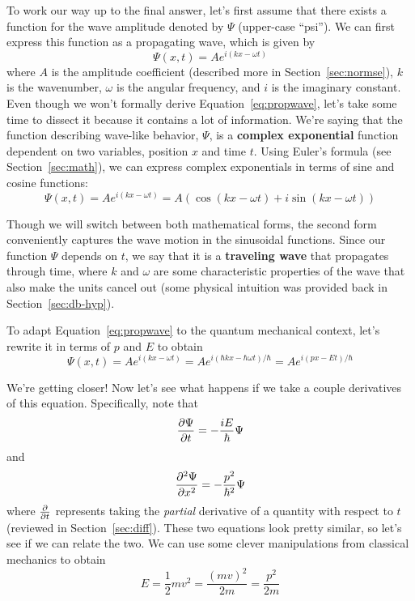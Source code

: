 To work our way up to the final answer, let's first assume that there exists a function for the wave amplitude denoted by $\Psi$ (upper-case ``psi''). We can first express this function as a propagating wave, which is given by
\begin{equation}
	\Psi(x,t) = Ae^{i(kx-\omega t)} \label{eq:propwave}
\end{equation}
where $A$ is the amplitude coefficient (described more in  Section~\ref{sec:normse}), $k$ is the wavenumber, $\omega$ is the angular frequency, and $i$ is the imaginary constant. Even though we won't formally derive Equation~\ref{eq:propwave}, let's take some time to dissect it because it contains a lot of information. We're saying that the function describing wave-like behavior, $\Psi$, is a \textbf{complex exponential} function dependent on two variables, position $x$ and time $t$. Using Euler's formula (see Section~\ref{sec:math}), we can express complex exponentials in terms of sine and cosine functions:
\begin{equation*}
	\Psi(x,t) = Ae^{i(kx-\omega t)} = A\left(\cos(kx-\omega t) + i\sin(kx-\omega t)\right)
\end{equation*}

Though we will switch between both mathematical forms, the second form conveniently captures the wave motion in the sinusoidal functions. Since our function $\Psi$ depends on $t$, we say that it is a \textbf{traveling wave} that propagates through time, where $k$ and $\omega$ are some characteristic properties of the wave that also make the units cancel out (some physical intuition was provided back in Section~\ref{sec:db-hyp}). \par 

To adapt Equation~\ref{eq:propwave} to the quantum mechanical context, let's rewrite it in terms of $p$ and $E$ to obtain
\begin{equation}
	\Psi(x,t) = Ae^{i(kx-\omega t)} = Ae^{i(\hbar kx - \hbar\omega t)/\hbar}  = Ae^{i(px-Et)/\hbar} \label{eq:qwave}
\end{equation}

We're getting closer! Now let's see what happens if we take a couple derivatives of this equation. Specifically, note that
\begin{equation}
	\pdv{\Psi}{t} = -\frac{iE}{\hbar}\Psi 		\label{eq:qwvdt}
\end{equation}
and
\begin{equation}
	\pdv[2]{\Psi}{x} = -\frac{p^2}{\hbar^2}\Psi \label{eq:qwvdx}
\end{equation}
where $\pdv{t}$ represents taking the \emph{partial} derivative of a quantity with respect to $t$ (reviewed in Section~\ref{sec:diff}). These two equations look pretty similar, so let's see if we can relate the two. We can use some clever manipulations from classical mechanics to obtain 
\begin{equation} 
E = \frac{1}{2}mv^2 = \frac{(mv)^2}{2m} = \frac{p^2}{2m}
\end{equation}

